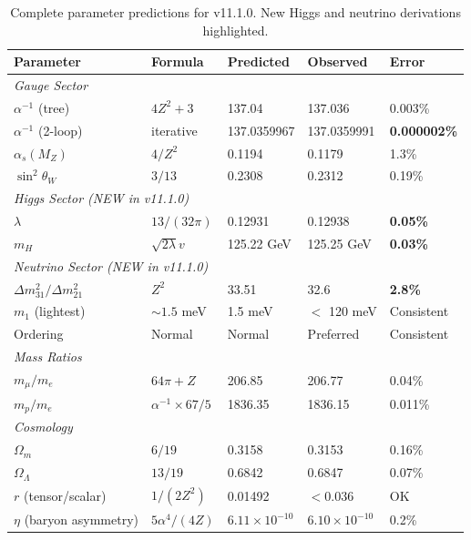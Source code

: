 \documentclass[11pt,a4paper]{article}
\theoremstyle{plain}
\theoremstyle{definition}
\theoremstyle{remark}
\newcommand{\MZ}{M_Z}
\newcommand{\alphas}{\alpha_s}
\newcommand{\thetaW}{\theta_W}
\newcommand{\Omegam}{\Omega_m}
\newcommand{\OmegaL}{\Omega_\Lambda}
\begin{document}
\begin{table}[h!]
\centering
\begin{tabular}{lllll}
\toprule
\textbf{Parameter} & \textbf{Formula} & \textbf{Predicted} & \textbf{Observed} & \textbf{Error} \\
\midrule
\multicolumn{5}{l}{\textit{Gauge Sector}} \\
$\alpha^{-1}$ (tree) & $4Z^2 + 3$ & 137.04 & 137.036 & 0.003\% \\
$\alpha^{-1}$ (2-loop) & iterative & 137.0359967 & 137.0359991 & \textbf{0.000002\%} \\
$\alphas(\MZ)$ & $4/Z^2$ & 0.1194 & 0.1179 & 1.3\% \\
$\sin^2\thetaW$ & $3/13$ & 0.2308 & 0.2312 & 0.19\% \\
\midrule
\multicolumn{5}{l}{\textit{Higgs Sector (NEW in v11.1.0)}} \\
$\lambda$ & $13/(32\pi)$ & 0.12931 & 0.12938 & \textbf{0.05\%} \\
$m_H$ & $\sqrt{2\lambda}v$ & 125.22 GeV & 125.25 GeV & \textbf{0.03\%} \\
\midrule
\multicolumn{5}{l}{\textit{Neutrino Sector (NEW in v11.1.0)}} \\
$\Delta m^2_{31}/\Delta m^2_{21}$ & $Z^2$ & 33.51 & 32.6 & \textbf{2.8\%} \\
$m_1$ (lightest) & $\sim 1.5$ meV & 1.5 meV & $<$ 120 meV & Consistent \\
Ordering & Normal & Normal & Preferred & Consistent \\
\midrule
\multicolumn{5}{l}{\textit{Mass Ratios}} \\
$m_\mu/m_e$ & $64\pi + Z$ & 206.85 & 206.77 & 0.04\% \\
$m_p/m_e$ & $\alpha^{-1} \times 67/5$ & 1836.35 & 1836.15 & 0.011\% \\
\midrule
\multicolumn{5}{l}{\textit{Cosmology}} \\
$\Omegam$ & $6/19$ & 0.3158 & 0.3153 & 0.16\% \\
$\OmegaL$ & $13/19$ & 0.6842 & 0.6847 & 0.07\% \\
$r$ (tensor/scalar) & $1/(2Z^2)$ & 0.01492 & $<0.036$ & OK \\
$\eta$ (baryon asymmetry) & $5\alpha^4/(4Z)$ & $6.11 \times 10^{-10}$ & $6.10 \times 10^{-10}$ & 0.2\% \\
\bottomrule
\end{tabular}
\caption{Complete parameter predictions for v11.1.0. New Higgs and neutrino derivations highlighted.}
\end{table}
\end{document}
